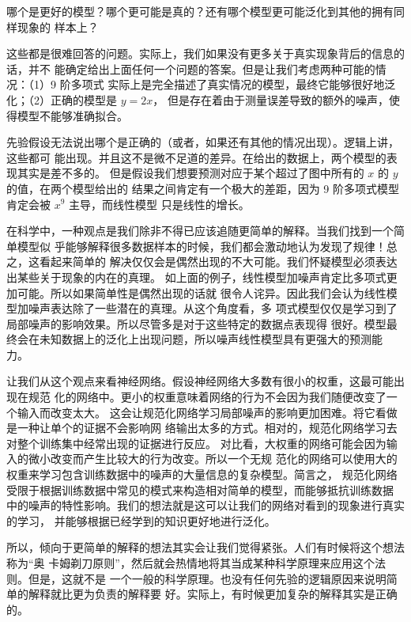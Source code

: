 哪个是更好的模型？哪个更可能是真的？还有哪个模型更可能泛化到其他的拥有同样现象的
样本上？

这些都是很难回答的问题。实际上，我们如果没有更多关于真实现象背后的信息的话，并不
能确定给出上面任何一个问题的答案。但是让我们考虑两种可能的情况：（1）9 阶多项式
实际上是完全描述了真实情况的模型，最终它能够很好地泛化；（2）正确的模型是 $y=2x$，
但是存在着由于测量误差导致的额外的噪声，使得模型不能够准确拟合。

先验假设无法说出哪个是正确的（或者，如果还有其他的情况出现）。逻辑上讲，这些都可
能出现。并且这不是微不足道的差异。在给出的数据上，两个模型的表现其实是差不多的。
但是假设我们想要预测对应于某个超过了图中所有的 $x$ 的 $y$ 的值，在两个模型给出的
结果之间肯定有一个极大的差距，因为 9 阶多项式模型肯定会被 $x^9$ 主导，而线性模型
只是线性的增长。

在科学中，一种观点是我们除非不得已应该追随更简单的解释。当我们找到一个简单模型似
乎能够解释很多数据样本的时候，我们都会激动地认为发现了规律！总之，这看起来简单的
解决仅仅会是偶然出现的不大可能。我们怀疑模型必须表达出某些关于现象的内在的真理。
如上面的例子，线性模型加噪声肯定比多项式更加可能。所以如果简单性是偶然出现的话就
很令人诧异。因此我们会认为线性模型加噪声表达除了一些潜在的真理。从这个角度看，多
项式模型仅仅是学习到了局部噪声的影响效果。所以尽管多是对于这些特定的数据点表现得
很好。模型最终会在未知数据上的泛化上出现问题，所以噪声线性模型具有更强大的预测能
力。

让我们从这个观点来看神经网络。假设神经网络大多数有很小的权重，这最可能出现在规范
化的网络中。更小的权重意味着网络的行为不会因为我们随便改变了一个输入而改变太大。
这会让规范化网络学习局部噪声的影响更加困难。将它看做是一种让单个的证据不会影响网
络输出太多的方式。相对的，规范化网络学习去对整个训练集中经常出现的证据进行反应。
对比看，大权重的网络可能会因为输入的微小改变而产生比较大的行为改变。所以一个无规
范化的网络可以使用大的权重来学习包含训练数据中的噪声的大量信息的复杂模型。简言之，
规范化网络受限于根据训练数据中常见的模式来构造相对简单的模型，而能够抵抗训练数据
中的噪声的特性影响。我们的想法就是这可以让我们的网络对看到的现象进行真实的学习，
并能够根据已经学到的知识更好地进行泛化。

所以，倾向于更简单的解释的想法其实会让我们觉得紧张。人们有时候将这个想法称为“奥
卡姆剃刀原则”，然后就会热情地将其当成某种科学原理来应用这个法则。但是，这就不是
一个一般的科学原理。也没有任何先验的逻辑原因来说明简单的解释就比更为负责的解释要
好。实际上，有时候更加复杂的解释其实是正确的。

